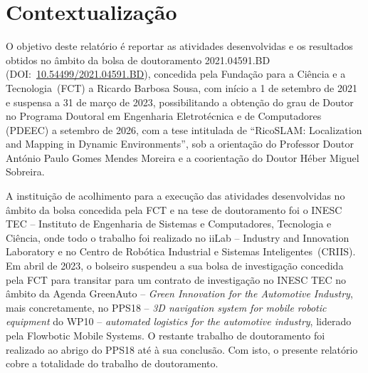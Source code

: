 \documentclass[11pt,a4paper,oneside]{article}
\newcommand{\bolsaref}{2021.04591.BD}
\newcommand{\bolsadoi}{10.54499/2021.04591.BD}
\newcommand{\tesetitulo}{RicoSLAM: Localization and Mapping in Dynamic Environments}
\newcommand{\autor}{Ricardo Barbosa Sousa}
\begin{document}
\renewcommand{\contentsname}{Conteúdo}
\tableofcontents
\clearpage

\section{Contextualização}\label{sec:contexto}

O objetivo deste relatório é reportar as atividades desenvolvidas e os resultados
obtidos no âmbito da bolsa de doutoramento \bolsaref{}
(DOI:~\href{https://doi.org/\bolsadoi}{\bolsadoi}), concedida pela Fundação para
a Ciência e a Tecnologia~(FCT) a \autor, com início a 1 de setembro de
2021 e suspensa a 31 de março de 2023, possibilitando a obtenção do grau de
Doutor no Programa Doutoral em Engenharia Eletrotécnica e de Computadores (PDEEC)
a setembro de 2026, com a tese intitulada de \enquote{\tesetitulo}, sob a
orientação do Professor Doutor António Paulo Gomes Mendes Moreira e a
coorientação do Doutor Héber Miguel Sobreira.

A instituição de acolhimento para a execução das atividades desenvolvidas no
âmbito da bolsa concedida pela FCT e na tese de doutoramento foi o INESC TEC --
Instituto de Engenharia de Sistemas e Computadores, Tecnologia e Ciência, onde
todo o trabalho foi realizado no iiLab -- Industry and Innovation Laboratory e no
Centro de Robótica Industrial e Sistemas Inteligentes~(CRIIS).
Em abril de 2023, o bolseiro suspendeu a sua bolsa de investigação concedida pela
FCT para transitar para um contrato de investigação no INESC TEC no âmbito da
Agenda GreenAuto -- \textit{Green Innovation for the Automotive Industry},
mais concretamente, no PPS18 -- \textit{3D navigation system for mobile robotic
equipment} do WP10 -- \textit{automated logistics for the automotive industry},
liderado pela Flowbotic Mobile Systems. O restante trabalho de doutoramento foi
realizado ao abrigo do PPS18 até à sua conclusão.
Com isto, o presente relatório cobre a totalidade do trabalho de doutoramento.
\end{document}

